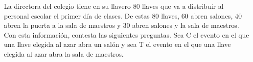 La directora del colegio tiene en su llavero 80 llaves que va a distribuir al personal escolar
el primer día de clases. De estas 80 llaves, 60 abren salones, 40 abren la puerta a la sala de maestros y
30 abren salones y la sala de maestros. Con esta información, contesta las siguientes preguntas.
Sea C el evento en el que una llave elegida al azar abra un salón y sea T el evento en el que una
llave elegida al azar abra la sala de maestros.
